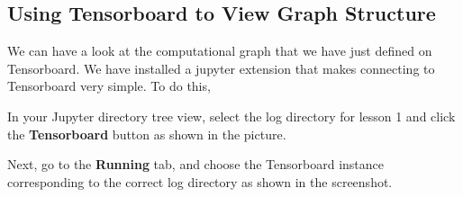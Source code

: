 \documentclass[11pt]{article}
\begin{document}
    \subsection{Using Tensorboard to View Graph
Structure}\label{using-tensorboard-to-view-graph-structure}

    We can have a look at the computational graph that we have just defined
on Tensorboard. We have installed a jupyter extension that makes
connecting to Tensorboard very simple. To do this,

In your Jupyter directory tree view, select the log directory for lesson
1 and click the \textbf{Tensorboard} button as shown in the picture. 

    Next, go to the \textbf{Running} tab, and choose the Tensorboard
instance corresponding to the correct log directory as shown in the
screenshot. 


    
    
    
    
\end{document}
